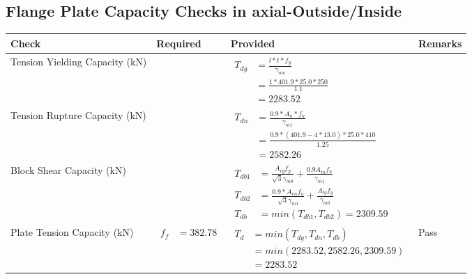 \documentclass{article}%
\begin{document}
\subsection{Flange Plate Capacity Checks in axial{-}Outside/Inside }%
\label{subsec:FlangePlateCapacityChecksinaxial{-}Outside/Inside}%
\renewcommand{\arraystretch}{1.2}%
\begin{longtable}{|p{4cm}|p{6cm}|p{5.5cm}|p{1.5cm}|}%
\hline%
\rowcolor{OsdagGreen}%
Check&Required&Provided&Remarks\\%
\hline%
\endhead%
\hline%
Tension Yielding Capacity (kN)&&$\begin{aligned} T_{dg} &= \frac{l*t*f_y}{\gamma_{mo}}\\ &=\frac{1*401.9*25.0*250}{1.1}\\ &=2283.52\end{aligned}$&\\%
\hline%
Tension Rupture Capacity (kN)&&$\begin{aligned} T_{dn} &= \frac{0.9*A_{n}*f_u}{\gamma_{m1}}\\ &=\frac{0.9*(401.9-4*13.0)*25.0*410}{1.25}\\ &=2582.26\end{aligned}$&\\%
\hline%
Block Shear Capacity (kN)&&$\begin{aligned}T_{db1} &= \frac{A_{vg} f_{y}}{\sqrt{3} \gamma_{m0}} + \frac{0.9 A_{tn} f_{u}}{\gamma_{m1}}\\ T_{db2} &= \frac{0.9*A_{vn} f_{u}}{\sqrt{3} \gamma_{m1}} + \frac{A_{tg} f_{y}}{\gamma_{m0}}\\ T_{db} &= min(T_{db1}, T_{db2})= 2309.59\end{aligned}$&\\%
\hline%
Plate Tension Capacity (kN)&$\begin{aligned} f_f &=382.78\end{aligned}$&$\begin{aligned} T_d &= min(T_{dg},T_{dn},T_{db})\\ &= min(2283.52,2582.26,2309.59)\\ &=2283.52\end{aligned}$&Pass\\%
\hline%
\end{longtable}

%
\newpage%
\end{document}
